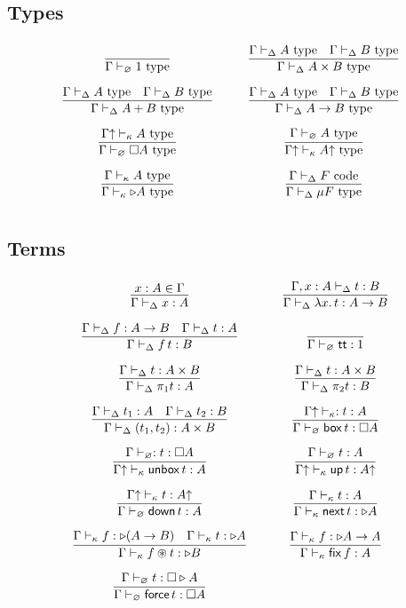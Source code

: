 \subsection*{Types}
\[\arraycolsep=15pt\def\arraystretch{2.8}
\begin{array}{cc}
\infer{\Gamma \vdash_{\varnothing} 1 \type}{} 
&
\infer{\Gamma \vdash_{\Delta} A \times B \type}{\Gamma \vdash_{\Delta} A \type & \Gamma \vdash_{\Delta} B \type}
\\
\infer{\Gamma \vdash_{\Delta} A + B \type}{\Gamma \vdash_{\Delta} A \type & \Gamma \vdash_{\Delta} B \type}
&
\infer{\Gamma \vdash_{\Delta} A \to B \type}{\Gamma \vdash_{\Delta} A \type & \Gamma \vdash_{\Delta} B \type} 
\\
\infer{\Gamma \vdash_{\varnothing} \square A \type}{\Gamma \up \vdash_{\kappa} A \type}
&
\infer{\Gamma \up \vdash_{\kappa} A \up \type}{\Gamma \vdash_{\varnothing} A \type}
\\
\infer{\Gamma \vdash_{\kappa} \later A \type}{\Gamma \vdash_{\kappa} A \type}
&
\infer{\Gamma \vdash_{\Delta} \mu F \type}{\Gamma \vdash_{\Delta} F \poly}
\end{array}
\]

\subsection*{Terms}

\[\arraycolsep=15pt\def\arraystretch{2.8}
\begin{array}{cc}
\infer{\Gamma \vdash_{\Delta} x : A}{x : A \in \Gamma}
&
\infer{\Gamma \vdash_{\Delta} \lambda x.\, t : A \to B}{\Gamma , x : A \vdash_{\Delta} t : B} 
\\
\infer{\Gamma \vdash_{\Delta} f\,t : B}{\Gamma \vdash_{\Delta} f : A \to B & \Gamma \vdash_{\Delta} t : A}
&
\infer{\Gamma \vdash_{\varnothing} {\mathsf{tt}} : 1}{}
\\
\infer{\Gamma \vdash_{\Delta} \pi_1 t : A}{\Gamma \vdash_{\Delta} t : A \times B}
&
\infer{\Gamma \vdash_{\Delta} \pi_2 t : B}{\Gamma \vdash_{\Delta} t : A \times B}
\\
\infer{\Gamma \vdash_{\Delta} (t_1,t_2) : A \times B}{\Gamma \vdash_{\Delta} t_1 : A & \Gamma \vdash_{\Delta} t_2 : B} 
&
\infer{\Gamma \vdash_{\varnothing} \boxtm\,t : \square A}{\Gamma \up \vdash_{\kappa} : t : A}
\\
\infer{\Gamma \up \vdash_{\kappa} \unboxtm\,t : A}{\Gamma \vdash_{\varnothing} : t : \square A}
&
\infer{\Gamma \up \vdash_{\kappa} \mathsf{up} \,t : A \up}{\Gamma \vdash_{\varnothing} t : A}
\\
\infer {\Gamma \vdash_{\varnothing} \mathsf{down}\,t : A}{\Gamma \up \vdash_{\kappa} t : A \up}
&
\infer{\Gamma \vdash_{\kappa} \next\,t : \later A}{\Gamma \vdash_{\kappa} t : A} 
\\
\infer{\Gamma \vdash_{\kappa} f \circledast t : \later B}{\Gamma \vdash_{\kappa} f : \later (A \to B) & \Gamma \vdash_{\kappa} t : \later A}
&
\infer{\Gamma \vdash_{\kappa} \fix \,f : A}{\Gamma \vdash_{\kappa} f : \later A \to A}
\\
\infer{\Gamma \vdash_{\varnothing} \force\,t : \square A}{\Gamma \vdash_{\varnothing} t : \square \later A}
\end{array}
\]

